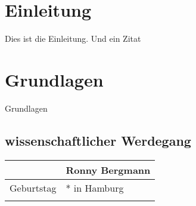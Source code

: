 \documentclass[
cleardoublepage=empty,	%
fontsize=11pt,			%
a4paper,				%
toc=bibliography,		%
listof=leveldown,		%
twoside,				%
BCOR=13mm,				%
headinclude=true,		%
footinclude=false,		%
parskip=half,			%
DIV=10					%
]{scrbook}				%
\newcommand{\UzLAutor}{Ronny Bergmann} 	%
\newcommand{\UzLGeburtsort}{Hamburg} %
\theoremstyle{normalstyle}
\begin{document}
	\tableofcontents
	\mainmatter
	\chapter{Einleitung}
	Dies ist die Einleitung. Und ein Zitat~\citep{TestEntry}
	\chapter{Grundlagen}
	Grundlagen
	
	
	\begingroup
		\let\chapter=\section
		\listoffigures %
		\lstlistoflistings %
		\listoftables %
	\endgroup
	\appendix
	\backmatter
		\cleardoublepage
		\chapter*{wissenschaftlicher Werdegang} %
		\begin{tabular}{rl}\toprule
			& \UzLAutor\\\midrule
			Geburtstag  & * in \UzLGeburtsort\\
			\\\bottomrule
		\end{tabular}
\end{document}
